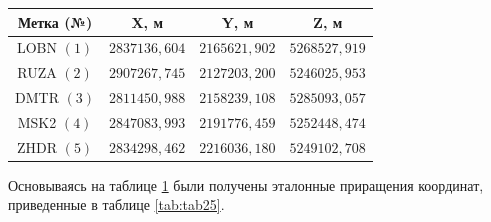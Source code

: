 \begin{table} [htbp]
	\centering\small
	\begin{threeparttable}%
	\label{tab:tab24}{
	\begin{tabular}{|c|c|c|c|}
		\hline
		\textbf{Метка (№)}			& \textbf{X, м}		& \textbf{Y, м}		& \textbf{Z, м}		\\ \hline
		LOBN $(1)$					& $2837136,604$		& $2165621,902$		& $5268527,919$		\\ \hline
		RUZA $(2)$					& $2907267,745$		& $2127203,200$		& $5246025,953$		\\ \hline
		DMTR $(3)$					& $2811450,988$		& $2158239,108$		& $5285093,057$		\\ \hline
		MSK2 $(4)$					& $2847083,993$		& $2191776,459$		& $5252448,474$		\\ \hline
		ZHDR $(5)$					& $2834298,462$		& $2216036,180$		& $5249102,708$		\\ \hline
	\end{tabular}
	}
	\end{threeparttable}
\end{table}

Основываясь на таблице \cref{tab:tab24} были получены эталонные приращения координат, приведенные в таблице \cref{tab:tab25}.

